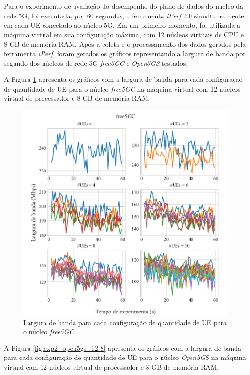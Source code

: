 Para o experimento de avaliação do desempenho do plano de dados do núcleo da rede 5G, foi executada, por 60 segundos, a ferramenta \textit{iPerf} 2.0 simultaneamente em cada UE conectado ao núcleo 5G.
Em um primeiro momento, foi utilizada a máquina virtual em sua configuração máxima, com 12 núcleos virtuais de CPU e 8 GB de memória RAM.
Após a coleta e o processamento dos dados gerados pela ferramenta \textit{iPerf}, foram gerados os gráficos representando a largura de banda por segundo dos núcleos de rede 5G \textit{free5GC} e \textit{Open5GS} testados.

A Figura \ref{fig:exp2_free5gc_12-8} apresenta os gráficos com a largura de banda para cada configuração de quantidade de UE para o núcleo \textit{free5GC} na máquina virtual com 12 núcleos virtual de processador e 8 GB de memória RAM.

\begin{figure}[H]
    \centering
    \includegraphics[width=1\textwidth]{TG2/Chapters/DataAnalysis/Figures/EXP2-free5GC-12C-8GB.pdf}
    \caption{Largura de banda para cada configuração de quantidade de UE para o núcleo \textit{free5GC}}
    \label{fig:exp2_free5gc_12-8}
\end{figure}

A Figura \ref{fig:exp2_open5gs_12-8} apresenta os gráficos com a largura de banda para cada configuração de quantidade de UE para o núcleo \textit{Open5GS} na máquina virtual com 12 núcleos virtual de processador e 8 GB de memória RAM.

